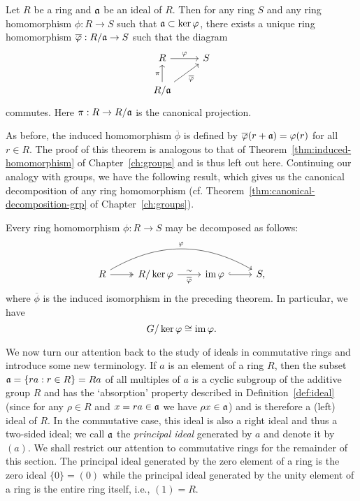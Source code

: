 \begin{theorem}
    \label{thm:ideal-universal-property}
    Let \(R\) be a ring and \(\mathfrak{a}\) be an ideal of \(R\). Then for any ring
    \(S\) and any ring homomorphism \(\phi: R \to S\) such that \(\mathfrak{a}
    \subset \ker \varphi\), there exists a unique ring homomorphism
    \(\overline{\varphi}: R/\mathfrak{a} \to S\) such that the diagram
    \[
        \begin{tikzcd}
            R \ar[r, "\phi"] & S\\
            R/\idl{a} \ar[u, "\pi"] \ar[ur, "\overline{\phi}"']
        \end{tikzcd}
    \]
    commutes. Here \(\pi: R \to R/\mathfrak{a}\) is the canonical projection.
\end{theorem}

As before, the induced homomorphism \(\overline{\phi}\) is defined by
\(\overline{\varphi}(r + \mathfrak{a}) = \varphi(r)\) for all \(r \in R\). The proof of
this theorem is analogous to that of Theorem~\ref{thm:induced-homomorphism} of
Chapter~\ref{ch:groups} and is thus left out here. Continuing our analogy with
groups, we have the following result, which gives us the canonical decomposition
of any ring homomorphism (cf. Theorem~\ref{thm:canonical-decomposition-grp} of
Chapter~\ref{ch:groups}).

\begin{theorem}
    \label{thm:canonical-decomposition-ring}
    Every ring homomorphism \(\phi: R \to S\) may be decomposed as follows:
    \[
        \begin{tikzcd}
            R \arrow[r, two heads] \arrow[rrr, bend left, "\phi"]   & R/\ker\phi \arrow[r,"\sim" above, "\overline{\phi}" below]   & \img\phi \arrow[r, hook]  & S,
        \end{tikzcd}
    \]
    where \(\overline{\phi}\) is the induced isomorphism in the preceding
    theorem. In particular, we have
    \[
        G/\ker\varphi \cong \operatorname{im}\varphi.
    \]
\end{theorem}

\bigskip

We now turn our attention back to the study of ideals in commutative rings and
introduce some new terminology. If \(a\) is an element of a ring \(R\), then the
subset \(\mathfrak{a} = \{ra : r \in R\} = Ra\) of all multiples of \(a\) is a cyclic
subgroup of the additive group \(R\) and has the `absorption' property described
in Definition~\ref{def:ideal} (since for any \(\rho \in R\) and \(x = ra \in
\mathfrak{a}\) we have \(\rho x \in \mathfrak{a}\)) and is therefore a (left) ideal of
\(R\). In the commutative case, this ideal is also a right ideal and thus a
two-sided ideal; we call \(\mathfrak{a}\) the \emph{principal ideal} generated by
\(a\) and denote it by \((a)\). We shall restrict our attention to commutative
rings for the remainder of this section. The principal ideal generated by the
zero element of a ring is the zero ideal \(\{0\} = (0)\) while the principal
ideal generated by the unity element of a ring is the entire ring itself, i.e.,
\((1) = R\).

